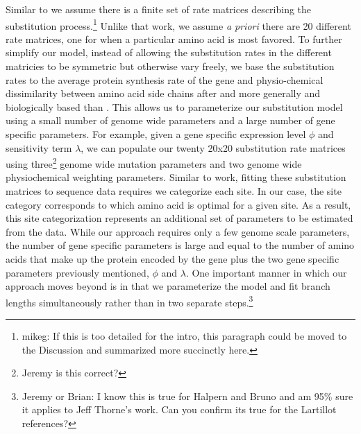 \documentclass{article}
\begin{document}
Similar to \citet{LartillotAndPhillipe2004,RodrigueAndLartillot2014} we assume there is a finite set of rate matrices describing the substitution process.\footnote{mikeg: If this is too detailed for the intro, this paragraph could be moved to the Discussion and summarized more succinctly here.}
Unlike that work, we assume \emph{a priori} there are 20 different rate matrices, one for when a particular amino acid is most favored.
To further simplify our model, instead of allowing the substitution rates in the different matricies to be symmetric but otherwise vary freely, we base the substitution rates to the average protein synthesis rate of the gene and physio-chemical dissimilarity between amino acid side chains after \citet{Grantham1974} and more generally and biologically based than \citet{YangEtAl1998,Yang2014}.
This allows us to parameterize our substitution model using a small number of genome wide parameters and a large number of gene specific parameters.
For example, given a gene specific expression level $\phi$ and sensitivity term $\lambda$, we can populate our twenty 20x20 substitution rate matrices using three\footnote{Jeremy is this correct?} genome wide mutation parameters and two genome wide physiochemical weighting parameters.
Similar to \citet{LartillotAndPhillipe2004,RodrigueAndLartillot2014} work, fitting these substitution matrices to sequence data requires we categorize each site.
In our case, the site category corresponds to which amino acid is optimal for a given site.
As a result, this site categorization represents an additional set of parameters to be estimated from the data.
While our approach requires only a few genome scale parameters, the number of gene specific parameters is large and equal to the number of amino acids that make up the protein encoded by the gene plus the two gene specific parameters previously mentioned, $\phi$ and $\lambda$.
One important manner in which our approach moves beyond \citet{HalpernAndBruno1988,RobinsonEtAl2003,LartillotAndPhillipe2004,ThorneEtAl2012,RodrigueAndLartillot2014} is in that we parameterize the model and fit branch lengths simultaneously rather than in two separate steps.\footnote{Jeremy or Brian: I know this is true for Halpern and Bruno and am 95\% sure it applies to Jeff Thorne's work.
Can you confirm its true for the Lartillot references?}
\end{document}
